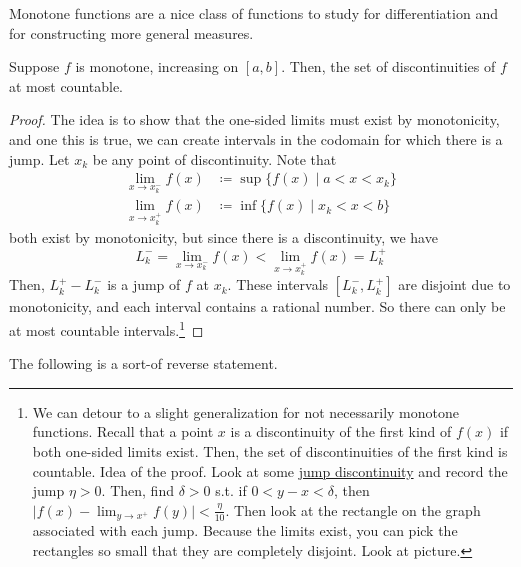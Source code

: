   Monotone functions are a nice class of functions to study for differentiation and for constructing more general measures. 

  \begin{theorem}
    \label{thm:monotone-functions-has-at-most-countable}
    Suppose $f$ is monotone, increasing on $[a, b]$. Then, the set of discontinuities of $f$ at most countable. 
  \end{theorem}
  \begin{proof}
    The idea is to show that the one-sided limits must exist by monotonicity, and one this is true, we can create intervals in the codomain for which there is a jump. Let $x_k$ be any point of discontinuity. Note that 
    \begin{align}
      \lim_{x \to x_k^-} f(x) & \coloneqq \sup \{ f(x) \mid a < x < x_k \} \\
      \lim_{x \to x_k^+} f(x) & \coloneqq \inf \{ f(x) \mid x_k < x < b \} 
    \end{align}
    both exist by monotonicity, but since there is a discontinuity, we have 
    \begin{equation}
      L_k^- = \lim_{x \to x_k^-} f(x) < \lim_{x \to x_k^+} f(x) = L_k^+
    \end{equation}
    Then, $L_k^+ - L_k^-$ is a jump of $f$ at $x_k$. These intervals $[L_k^-, L_k^+]$ are disjoint due to monotonicity, and each interval contains a rational number. So there can only be at most countable intervals.\footnote{We can detour to a slight generalization for not necessarily monotone functions. Recall that a point $x$ is a discontinuity of the first kind of $f(x)$ if both one-sided limits exist. Then, the set of discontinuities of the first kind is countable. Idea of the proof. Look at some \hyperref[real-def:jump-discontinuity]{jump discontinuity} and record the jump $\eta > 0$. Then, find $\delta > 0$ s.t. if $0 < y - x < \delta$, then $\big| f(x)  - \lim_{y \to x^+} f(y) \big|  < \frac{\eta}{10}$. Then look at the rectangle on the graph associated with each jump. Because the limits exist, you can pick the rectangles so small that they are completely disjoint. Look at picture. }
  \end{proof}

  The following is a sort-of reverse statement.  

